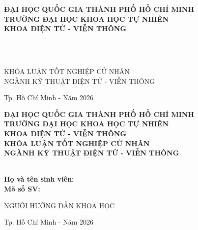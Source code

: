\hypersetup{pageanchor=false}
\begin{titlepage}

\begin{center}
\textbf{ĐẠI HỌC QUỐC GIA THÀNH PHỐ HỒ CHÍ MINH\\
TRƯỜNG ĐẠI HỌC KHOA HỌC TỰ NHIÊN\\
KHOA ĐIỆN TỬ - VIỄN THÔNG}\\[2cm]

{ \Large \bfseries \tenSV \\[2cm] }

{ \Large \bfseries \tenKL \\[5cm]}

\large KHÓA LUẬN TỐT NGHIỆP CỬ NHÂN\\
\large NGÀNH KỸ THUẬT ĐIỆN TỬ - VIỄN THÔNG


\vfill
Tp. Hồ Chí Minh - Năm 2026

\end{center}

\pagebreak
\myemptypage

\begin{center}
\textbf{ĐẠI HỌC QUỐC GIA THÀNH PHỐ HỒ CHÍ MINH\\
TRƯỜNG ĐẠI HỌC KHOA HỌC TỰ NHIÊN\\
KHOA ĐIỆN TỬ - VIỄN THÔNG}\\[2cm]

\large \textbf{KHÓA LUẬN TỐT NGHIỆP CỬ NHÂN}\\
\large \textbf{NGÀNH KỸ THUẬT ĐIỆN TỬ - VIỄN THÔNG}\\[2cm]

{ \Large \bfseries \tenKL \\[2cm] }

{\bfseries Họ và tên sinh viên: \tenSV\\
Mã số SV: \mssv\\[2cm]}

NGƯỜI HƯỚNG DẪN KHOA HỌC\\
\tenGVHD

\vfill
Tp. Hồ Chí Minh - Năm 2026

\end{center}
\thispagestyle{empty}
\myemptypage

\end{titlepage}
\hypersetup{pageanchor=true}
